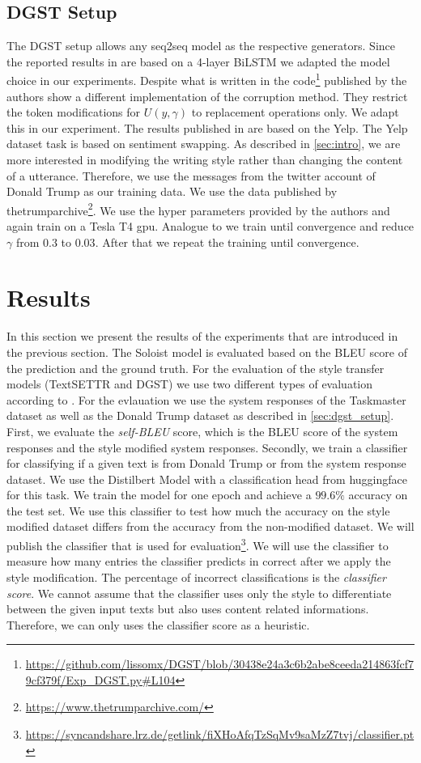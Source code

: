 \documentclass[twocolumn]{tum-article}
\begin{document}
\subsection{DGST Setup}\label{sec:dgst_setup}
The DGST setup allows any seq2seq model as the respective generators. Since the reported results in \cite{li2020dgst} are based on a 4-layer BiLSTM we adapted the model choice in our experiments. Despite what is written in \cite{li2020dgst} the code\footnote{\url{https://github.com/lissomx/DGST/blob/30438e24a3c6b2abe8ceeda214863fcf79cf379f/Exp\_DGST.py\#L104}} published by the authors show a different implementation of the corruption method. They restrict the token modifications for $U(y, \gamma)$ to replacement operations only. We adapt this in our experiment. The results published in \cite{li2020dgst} are based on the Yelp\cite{li2018delete}. The Yelp dataset task is based on sentiment swapping. As described in \autoref{sec:intro}, we are more interested in modifying the writing style rather than changing the content of a utterance. Therefore, we use the messages from the twitter account of Donald Trump as our training data. We use the data published by thetrumparchive\footnote{\url{https://www.thetrumparchive.com/}}. We use the hyper parameters provided by the authors and again train on a Tesla T4 gpu. Analogue to \cite{li2020dgst} we train until convergence and reduce $\gamma$ from $0.3$ to $0.03$. After that we repeat the training until convergence.     
\section{Results}
In this section we present the results of the experiments that are introduced in the previous section. The Soloist model is evaluated based on the BLEU score of the prediction and the ground truth. For the evaluation of the style transfer models (TextSETTR and DGST) we use two different types of evaluation according to \cite{riley2020textsettr}. For the evlauation we use the system responses of the Taskmaster dataset as well as the Donald Trump dataset as described in \autoref{sec:dgst_setup}. First, we evaluate the \textit{self-BLEU} score, which is the BLEU score of the system responses and the style modified system responses. Secondly, we train a classifier for classifying if a given text is from Donald Trump or from the system response dataset. We use the Distilbert Model \cite{sanh2019distilbert} with a classification head from huggingface for this task. We train the model for one epoch and achieve a $99.6\%$ accuracy on the test set. We use this classifier to test how much the accuracy on the style modified dataset differs from the accuracy from the non-modified dataset. We will publish the classifier that is used for evaluation\footnote{\url{https://syncandshare.lrz.de/getlink/fiXHoAfqTzSqMv9saMzZ7tvj/classifier.pt}}. We will use the classifier to measure how many entries the classifier predicts in correct after we apply the style modification. The percentage of incorrect classifications is the \textit{classifier score}. We cannot assume that the classifier uses only the style to differentiate between the given input texts but also uses content related informations. Therefore, we can only uses the classifier score as a heuristic.  
\end{document}
